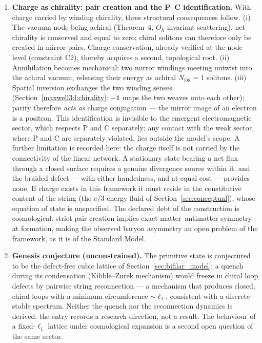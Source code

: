 \documentclass[11pt,a4paper]{article}
\theoremstyle{plain}
\theoremstyle{remark}
\newcommand{\Ncd}{\ensuremath{N_{\mathrm{DS}}}}
\begin{document}
\begin{enumerate}
    \item \textbf{Charge as chirality: pair creation and the P--C identification.} With charge carried by winding chirality, three structural consequences follow. (i) The vacuum node being achiral (Theorem~4, $O_h$-invariant scattering), net chirality is conserved and equal to zero; chiral solitons can therefore only be created in mirror pairs. Charge conservation, already verified at the node level (constraint C2), thereby acquires a second, topological root. (ii) Annihilation becomes mechanical: two mirror windings meeting untwist into the achiral vacuum, releasing their energy as achiral $\Ncd = 1$ solitons. (iii) Spatial inversion exchanges the two winding senses (Section~\ref{maxwell3d:chirality}: $-\mathbb{1}$ maps the two weaves onto each other); parity therefore \emph{acts as} charge conjugation --- the mirror image of an electron is a positron. This identification is invisible to the emergent electromagnetic sector, which respects P and C separately; any contact with the weak sector, where P and C are separately violated, lies outside the model's scope. A further limitation is recorded here: the charge itself is not carried by the connectivity of the linear network. A stationary state bearing a net flux through a closed surface requires a genuine divergence source within it, and the braided defect --- with either handedness, and at equal cost --- provides none. If charge exists in this framework it must reside in the constitutive content of the string (the $e/3$ energy fluid of Section~\ref{sec:conceptual}), whose equation of state is unspecified. The declared debt of the construction is cosmological: strict pair creation implies exact matter--antimatter symmetry at formation, making the observed baryon asymmetry an open problem of the framework, as it is of the Standard Model.

    \item \textbf{Genesis conjecture (unconstrained).} The primitive state is conjectured to be the defect-free cubic lattice of Section~\ref{sec:bifilar_model}; a quench during its condensation (Kibble--Zurek mechanism) would freeze in chiral loop defects by pairwise string reconnection --- a mechanism that produces closed, chiral loops with a minimum circumference $\sim \ell_1$, consistent with a discrete stable spectrum. Neither the quench nor the reconnection dynamics is derived; the entry records a research direction, not a result. The behaviour of a fixed-$\ell_1$ lattice under cosmological expansion is a second open question of the same sector.


\end{enumerate}
\end{document}
